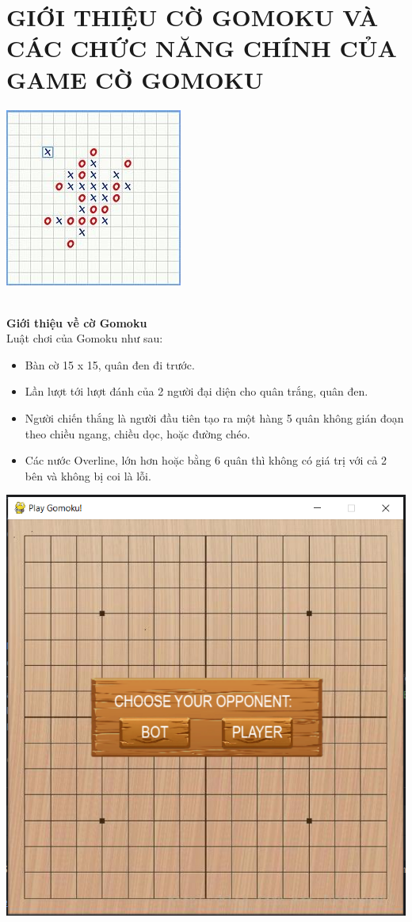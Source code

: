 \documentclass[a4paper]{article}
\begin{document}
\newpage
\section{GIỚI THIỆU CỜ GOMOKU VÀ CÁC CHỨC NĂNG CHÍNH CỦA GAME CỜ GOMOKU}
\begin{center}
\includegraphics{images/gomoku.jpg}
\end{center}
\\
\textbf{Giới thiệu về cờ Gomoku} \\
Luật chơi của Gomoku như sau:
\begin{itemize}
    \item Bàn cờ 15 x 15, quân đen đi trước.
    \item Lần lượt tới lượt đánh của 2 người đại diện cho quân trắng, quân đen. 
    \item Người chiến thắng là người đầu tiên tạo ra một hàng 5 quân không gián đoạn theo chiều ngang, chiều dọc, hoặc đường chéo.
    \item Các nước Overline, lớn hơn hoặc bằng 6 quân thì không có giá trị với cả 2 bên và không bị coi là lỗi.
\end{itemize}
\begin{center}
\includegraphics{images/ChoseGameModeGomuku.png} \\
\end{center}
\end{document}
